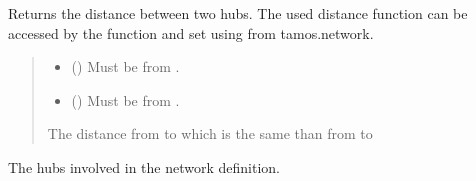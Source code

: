 \documentclass[letterpaper,10pt,english]{sphinxmanual}
\begin{document}
\begin{fulllineitems}

\begin{fulllineitems}
\label{\detokenize{generated/tamos.network.HREThermalNetwork:tamos.network.HREThermalNetwork.get_distance}}
\pysigstartsignatures
{}
\pysigstopsignatures
\sphinxAtStartPar
Returns the distance between two hubs.
The used distance function can be accessed by the  function
and set using  from tamos.network.
\begin{quote}\begin{description}
\begin{itemize}
\item {} 
\sphinxAtStartPar
{} ({\hyperref[\detokenize{generated/tamos.Hub:tamos.Hub}]{}}) \textendash{} Must be from .

\item {} 
\sphinxAtStartPar
{} ({\hyperref[\detokenize{generated/tamos.Hub:tamos.Hub}]{}}) \textendash{} Must be from .

\end{itemize}

\sphinxAtStartPar
The distance from  to  which is the same than from  to 

\end{description}\end{quote}

\end{fulllineitems}


\begin{fulllineitems}
\label{\detokenize{generated/tamos.network.HREThermalNetwork:tamos.network.HREThermalNetwork.hubs}}
\pysigstartsignatures
{}
\pysigstopsignatures
\sphinxAtStartPar
The hubs involved in the network definition.


\end{fulllineitems}
\end{fulllineitems}
\end{document}
